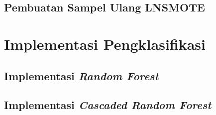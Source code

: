 	\subsection{Pembuatan Sampel Ulang LNSMOTE}
	\label{bab:03:sampel_ulang_lnsmote}
	

	\section{Implementasi Pengklasifikasi}
	

	\subsection{Implementasi \textit{Random Forest}}
	\label{subsection:implementasi_rf}
	

	\subsection{Implementasi \textit{Cascaded Random Forest}}
	\label{subsection:implementasi_crf}
	
